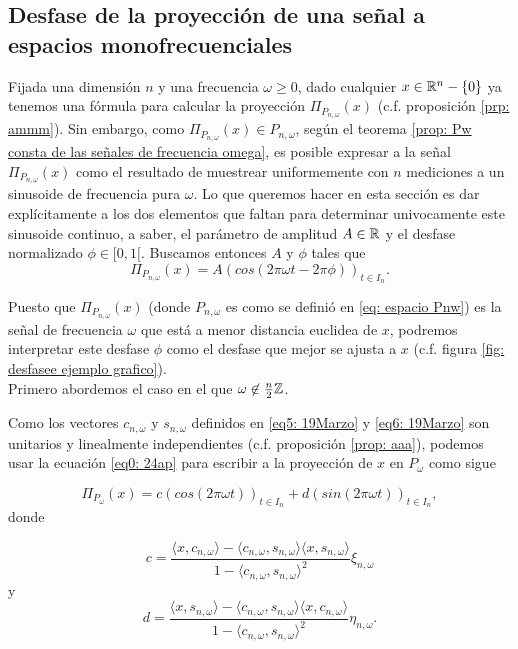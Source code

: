 \subsection{Desfase de la proyección de una señal a espacios monofrecuenciales}


Fijada una dimensión $n$ y 
una frecuencia $\omega \geq 0$,
dado cualquier 
$x \in \mathbb{R}^{n}-\{ 0 \}$
ya tenemos una fórmula para calcular la
proyección $\Pi_{P_{n, \omega}}(x)$ 
(c.f. proposición \ref{prp: ammm}).
Sin embargo, 
como
$\Pi_{P_{n, \omega}}(x) \in P_{n, \omega}$, 
según el teorema 
\ref{prop: Pw consta de las señales de frecuencia omega}, 
es posible expresar a la señal $\Pi_{P_{n, \omega}}(x)$
como el resultado de muestrear uniformemente con $n$ mediciones
a un sinusoide de frecuencia pura $\omega$. Lo que queremos hacer
en esta sección es dar explícitamente a los dos elementos que
faltan para determinar univocamente este sinusoide continuo,
a saber, el parámetro de amplitud $A \in \mathbb{R}$ y el 
desfase normalizado $\phi \in [0,1[$. Buscamos entonces $A$
y $\phi$ tales que
\[
\Pi_{P_{n, \omega}}(x) = A (cos(2 \pi \omega t -  2 \pi \phi ))_{t \in I_{n}}.
\]
 

Puesto que
$\Pi_{P_{n, \omega}}(x)$ (donde $P_{n, \omega}$ es como se definió en 
\eqref{eq: espacio Pnw}) 
es la señal de frecuencia $\omega$ que está a menor
distancia euclidea de $x$, podremos interpretar este
desfase $\phi$ como el desfase que mejor se ajusta a $x$
(c.f. figura \ref{fig: desfasee ejemplo grafico}). \\

Primero abordemos el caso en el que
$\omega \not\in \frac{n}{2} \mathbb{Z}$. 

Como los vectores $c_{n, \omega}$ y $s_{n, \omega}$ 
definidos en \eqref{eq5: 19Marzo} y \eqref{eq6: 19Marzo}
son unitarios y linealmente independientes (c.f. proposición
\ref{prop: aaa}),
podemos usar la ecuación \eqref{eq0: 24ap}
para escribir a la proyección de $x$ en $P_{\omega}$ como sigue


\begin{equation}
\label{eq3: 20Marzo}
\Pi_{P_{\omega}}(x)= c (cos (2 \pi \omega t))_{t \in I_{n}} + d 
(sin (2 \pi \omega t))_{t \in I_{n}},
\end{equation}
donde

\begin{equation}
\label{eq4: 20Marzo}
c= \frac{
\langle x, c_{n, \omega} \rangle - \langle c_{n, \omega}, s_{n, \omega} \rangle
\langle x, s_{n, \omega} \rangle
}{1-\langle c_{n, \omega}, s_{n, \omega} \rangle^{2}} \xi_{n, \omega}
\end{equation}
y
\begin{equation}
\label{eq5: 20Marzo}
d= \frac{
\langle x, s_{n, \omega} \rangle - \langle c_{n, \omega}, s_{n, \omega} \rangle
\langle x, c_{n, \omega} \rangle
}{1-\langle c_{n, \omega}, s_{n, \omega} \rangle^{2}} \eta_{n, \omega}.
\end{equation}

